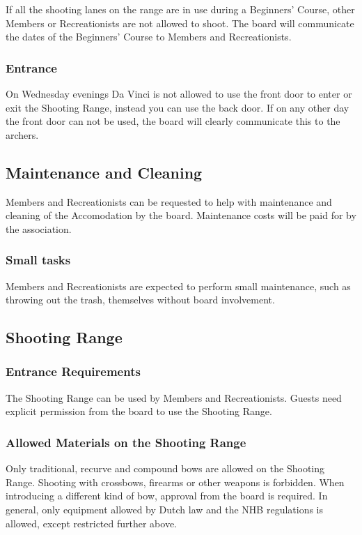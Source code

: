 \documentclass[a4paper]{article}
\begin{document}
\bigskip

If all the shooting lanes on the range are in use during a { Beginners’ Course}, other { Members} or { Recreationists} are not allowed to shoot. The board will communicate the dates of the { Beginners’ Course} to { Members} and { Recreationists}.

\subsubsection{Entrance}
On Wednesday evenings Da Vinci is not allowed to use the front door to enter or exit the Shooting Range, instead you can use the back door. If on any other day the front door can not be used, the board will clearly communicate this to the { archers}. 

\subsection{Maintenance and Cleaning}
{ Members} and { Recreationists} can be requested to help with maintenance and cleaning of the { Accomodation} by the board. Maintenance costs will be paid for by the association.

\subsubsection{Small tasks}
{ Members} and { Recreationists} are expected to perform small maintenance, such as throwing out the trash, themselves without board involvement.

\subsection{Shooting Range}
\subsubsection{Entrance Requirements}
The Shooting Range can be used by { Members} and { Recreationists}. { Guests} need explicit permission from the board to use the Shooting Range. 

\subsubsection{Allowed Materials on the Shooting Range}
Only traditional, recurve and compound bows are allowed on the Shooting Range. Shooting with crossbows, firearms or other weapons is forbidden. When introducing a different kind of bow, approval from the board is required. In general, only equipment allowed by Dutch law and the { NHB} regulations is allowed, except restricted further above.
\end{document}
